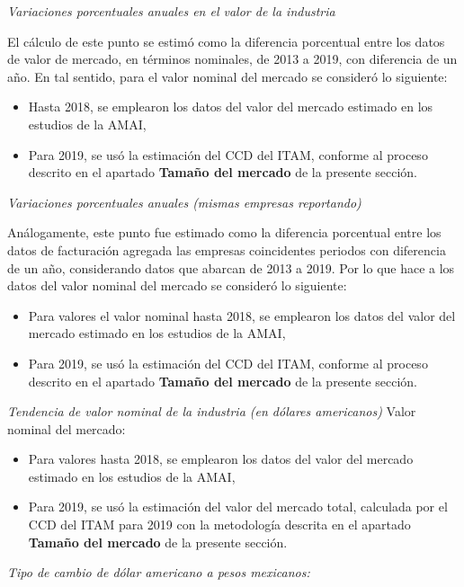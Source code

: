 \noindent \emph{Variaciones porcentuales anuales en el valor de la industria}

El cálculo de este punto se estimó como la diferencia porcentual entre los datos de valor de mercado, en términos nominales, de 2013 a 2019, con diferencia de un año. En tal sentido, para el valor nominal del mercado se consideró lo siguiente:

\begin{itemize}
\item  Hasta 2018, se emplearon los datos del valor del mercado estimado en los estudios de la AMAI, 
\item  Para 2019, se usó la estimación del CCD del ITAM, conforme al proceso descrito en el apartado \textbf{Tamaño del mercado} de la presente sección.
\end{itemize}

\noindent \emph{Variaciones porcentuales anuales (mismas empresas reportando)}

Análogamente, este punto fue estimado como la diferencia porcentual entre los datos de facturación agregada las empresas coincidentes periodos con diferencia de un año, considerando datos que abarcan de 2013 a 2019. Por lo que hace a los datos del valor nominal del mercado se consideró lo siguiente:

\begin{itemize}
\item Para valores el valor nominal hasta 2018, se emplearon los datos del valor del mercado estimado en los estudios de la AMAI, 
\item Para 2019, se usó la estimación del CCD del ITAM, conforme al proceso descrito en el apartado \textbf{Tamaño del mercado} de la presente sección.
\end{itemize}

\noindent \emph{Tendencia de valor nominal de la industria (en dólares americanos)}
Valor nominal del mercado:
\begin{itemize}
\item Para valores hasta 2018, se emplearon los datos del valor del mercado estimado en los estudios de la AMAI, 
\item Para 2019, se usó la estimación del valor del mercado total, calculada por el CCD del ITAM para 2019 con la metodología descrita en el apartado \textbf{Tamaño del mercado} de la presente sección.
\end{itemize}

\noindent \emph{Tipo de cambio de dólar americano a pesos mexicanos:}

